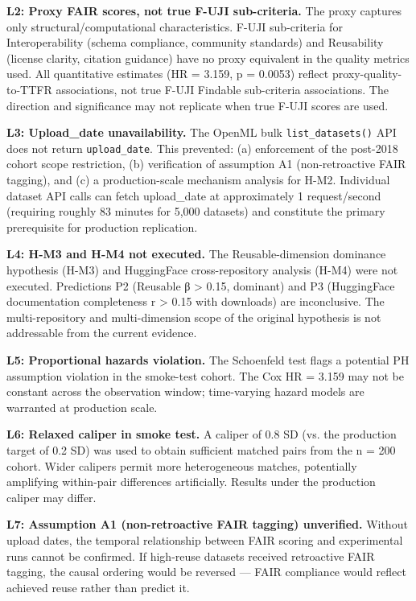 \textbf{L2: Proxy FAIR scores, not true F-UJI sub-criteria.} The proxy captures only structural/computational characteristics. F-UJI sub-criteria for Interoperability (schema compliance, community standards) and Reusability (license clarity, citation guidance) have no proxy equivalent in the quality metrics used. All quantitative estimates (HR = 3.159, p = 0.0053) reflect proxy-quality-to-TTFR associations, not true F-UJI Findable sub-criteria associations. The direction and significance may not replicate when true F-UJI scores are used.

\textbf{L3: Upload_date unavailability.} The OpenML bulk \texttt{list_datasets()} API does not return \texttt{upload_date}. This prevented: (a) enforcement of the post-2018 cohort scope restriction, (b) verification of assumption A1 (non-retroactive FAIR tagging), and (c) a production-scale mechanism analysis for H-M2. Individual dataset API calls can fetch upload_date at approximately 1 request/second (requiring roughly 83 minutes for 5,000 datasets) and constitute the primary prerequisite for production replication.

\textbf{L4: H-M3 and H-M4 not executed.} The Reusable-dimension dominance hypothesis (H-M3) and HuggingFace cross-repository analysis (H-M4) were not executed. Predictions P2 (Reusable β > 0.15, dominant) and P3 (HuggingFace documentation completeness r > 0.15 with downloads) are inconclusive. The multi-repository and multi-dimension scope of the original hypothesis is not addressable from the current evidence.

\textbf{L5: Proportional hazards violation.} The Schoenfeld test flags a potential PH assumption violation in the smoke-test cohort. The Cox HR = 3.159 may not be constant across the observation window; time-varying hazard models are warranted at production scale.

\textbf{L6: Relaxed caliper in smoke test.} A caliper of 0.8 SD (vs. the production target of 0.2 SD) was used to obtain sufficient matched pairs from the n = 200 cohort. Wider calipers permit more heterogeneous matches, potentially amplifying within-pair differences artificially. Results under the production caliper may differ.

\textbf{L7: Assumption A1 (non-retroactive FAIR tagging) unverified.} Without upload dates, the temporal relationship between FAIR scoring and experimental runs cannot be confirmed. If high-reuse datasets received retroactive FAIR tagging, the causal ordering would be reversed — FAIR compliance would reflect achieved reuse rather than predict it.

